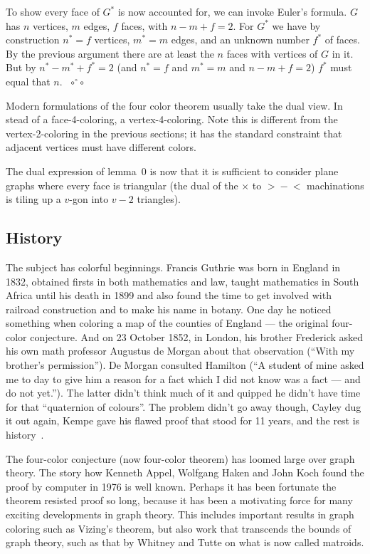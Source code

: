 \documentclass[12pt]{article}
\let\S\scriptstyle
\def\qed{ ${\S\circ}\!{}^\circ\!{\S\circ}$}
\begin{document}
To show every face of $G^*$ is now accounted for, we can invoke Euler's
formula. $G$ has $n$ vertices, $m$ edges, $f$ faces, with $n-m+f=2$. For
$G^*$ we have by construction $n^*=f$ vertices, $m^*=m$ edges, and an unknown
number $f^*$ of faces. By the previous argument there are at least the $n$
faces with vertices of $G$ in it. But by $n^*-m^*+f^*=2$ (and $n^*=f$ and
$m^*=m$ and $n-m+f=2$) $f^*$ must equal that $n$.~\qed

Modern formulations of the four color theorem usually take the dual view. In
stead of a face-4-coloring, a vertex-4-coloring. Note this is different from
the vertex-2-coloring in the previous sections; it has the standard constraint
that adjacent vertices must have different colors.

The dual expression of lemma~0 is now that it is sufficient to consider plane
graphs where every face is triangular (the dual of the $\times$ to
\hbox{$\S>\!-\!<$} machinations is tiling up a $v$-gon into
$v-2$ triangles).

\vfill\pagebreak
\subsection*{History}

The subject has colorful beginnings. Francis Guthrie was born in England in
1832, obtained firsts in both mathematics and law, taught mathematics in South
Africa until his death in 1899 and also found the time to get involved with
railroad construction and to make his name in botany. One day he noticed
something when coloring a map of the counties of England --- the original
four-color conjecture. And on 23 October 1852, in London, his brother Frederick
asked his own math professor Augustus de Morgan about that observation
(``With my brother's permission''). De Morgan consulted Hamilton (``A
student of mine asked me to day to give him a reason for a fact which I did
not know was a fact --- and do not yet.''). The latter didn't think much of
it and quipped he didn't have time for that ``quaternion of colours''.
The problem didn't go away though, Cayley dug it out again, Kempe gave his
flawed proof that stood for 11 years, and the rest is history~\cite{FW77,FF94}.

The four-color conjecture (now four-color theorem) has loomed large over graph theory. The story how Kenneth Appel, Wolfgang Haken and John Koch found the proof by computer in 1976 is well known. Perhaps it has been fortunate the theorem resisted proof so long, because it has been a motivating force for many exciting developments in graph theory. This includes important results in graph coloring such as Vizing's theorem, but also work that transcends the bounds of graph theory, such as that by Whitney and Tutte on what is now called matroids.
\end{document}
